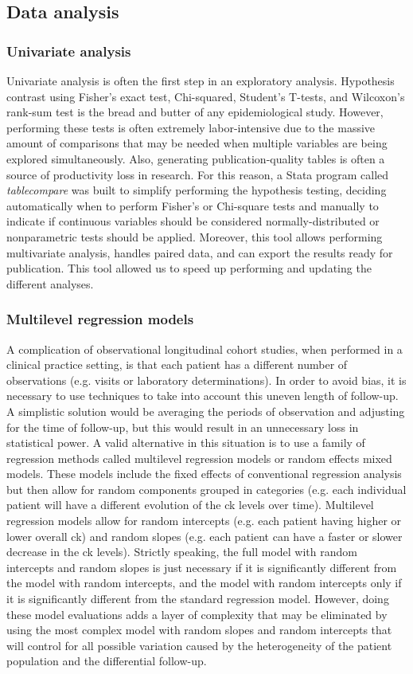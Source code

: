 \subsection{Data analysis}
\subsubsection{Univariate analysis}
Univariate analysis is often the first step in an exploratory analysis. Hypothesis contrast using Fisher's exact test, Chi-squared, Student's T-tests, and Wilcoxon's rank-sum test is the bread and butter of any epidemiological study. However, performing these tests is often extremely labor-intensive due to the massive amount of comparisons that may be needed when multiple variables are being explored simultaneously. Also, generating publication-quality tables is often a source of productivity loss in research. For this reason, a Stata program called \textit{table\textunderscore compare} was built to simplify performing the hypothesis testing, deciding automatically when to perform Fisher's or Chi-square tests and manually to indicate if continuous variables should be considered normally-distributed or nonparametric tests should be applied. Moreover, this tool allows performing multivariate analysis, handles paired data, and can export the results ready for publication. This tool allowed us to speed up performing and updating the different analyses.

\subsubsection{Multilevel regression models}
A complication of observational longitudinal cohort studies, when performed in a clinical practice setting, is that each patient has a different number of observations (e.g. visits or laboratory determinations). In order to avoid bias, it is necessary to use techniques to take into account this uneven length of follow-up. A simplistic solution would be averaging the periods of observation and adjusting for the time of follow-up, but this would result in an unnecessary loss in statistical power. A valid alternative in this situation is to use a family of regression methods called multilevel regression models or random effects mixed models. These models include the fixed effects of conventional regression analysis but then allow for random components grouped in categories (e.g. each individual patient will have a different evolution of the \gls{ck} levels over time). Multilevel regression models allow for random intercepts (e.g. each patient having higher or lower overall \gls{ck}) and random slopes (e.g. each patient can have a faster or slower decrease in the \gls{ck} levels). Strictly speaking, the full model with random intercepts and random slopes is just necessary if it is significantly different from the model with random intercepts, and the model with random intercepts only if it is significantly different from the standard regression model. However, doing these model evaluations adds a layer of complexity that may be eliminated by using the most complex model with random slopes and random intercepts that will control for all possible variation caused by the heterogeneity of the patient population and the differential follow-up.

